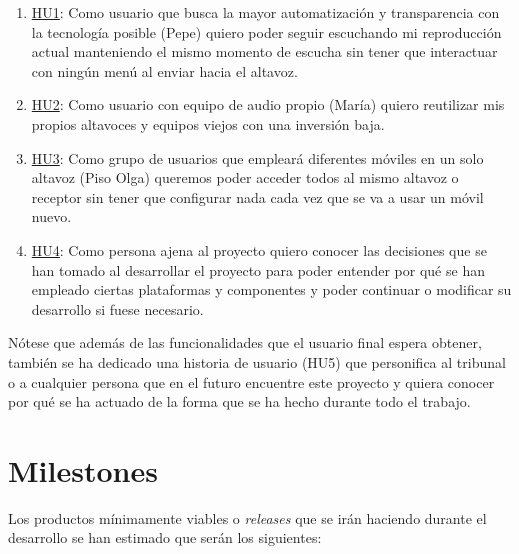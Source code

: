 \begin{enumerate}
    \item \href{https://github.com/migueorg/One-touch-music-streaming-TFG-ETSIIT/issues/10}{HU1}: Como usuario que busca la mayor automatización y transparencia
    con la tecnología posible (Pepe) quiero poder seguir escuchando mi
    reproducción actual manteniendo el mismo momento de escucha sin tener que
    interactuar con ningún menú al enviar hacia el altavoz.
    \item \href{https://github.com/migueorg/One-touch-music-streaming-TFG-ETSIIT/issues/11}{HU2}: Como usuario con equipo de audio propio (María) quiero reutilizar
    mis propios altavoces y equipos viejos con una inversión baja.
    \item \href{https://github.com/migueorg/One-touch-music-streaming-TFG-ETSIIT/issues/13}{HU3}: Como grupo de usuarios que empleará diferentes móviles en un solo
    altavoz (Piso Olga) queremos poder acceder todos al mismo altavoz o receptor
    sin tener que configurar nada cada vez que se va a usar un móvil nuevo.
    \item \href{https://github.com/migueorg/One-touch-music-streaming-TFG-ETSIIT/issues/14}{HU4}: Como persona ajena al proyecto quiero conocer las decisiones que
    se han tomado al desarrollar el proyecto para poder entender por qué se han
    empleado ciertas plataformas y componentes y poder continuar o modificar su
    desarrollo si fuese necesario.
\end{enumerate}

Nótese que además de las funcionalidades que el usuario final espera obtener,
también se ha dedicado una historia de usuario (HU5) que personifica al tribunal o
a cualquier persona que en el futuro encuentre este proyecto y quiera conocer
por qué se ha actuado de la forma que se ha hecho durante todo el trabajo.

\section{Milestones}
Los productos mínimamente viables o \emph{releases} que se irán haciendo durante el
desarrollo se han estimado que serán los siguientes:


